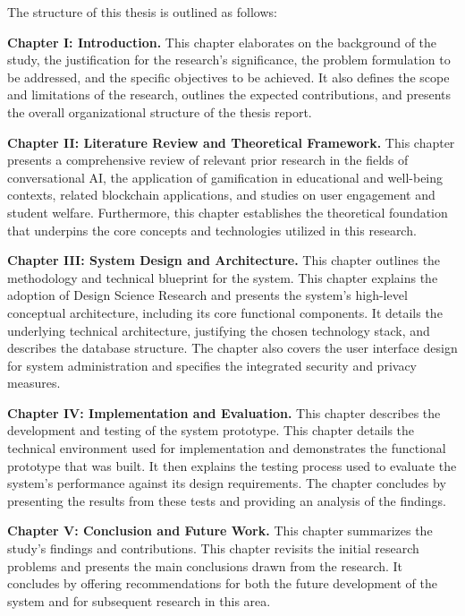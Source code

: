 The structure of this thesis is outlined as follows:

\textbf{Chapter I: Introduction.} This chapter elaborates on the background of the study, the justification for the research's significance, the problem formulation to be addressed, and the specific objectives to be achieved. It also defines the scope and limitations of the research, outlines the expected contributions, and presents the overall organizational structure of the thesis report.

\textbf{Chapter II: Literature Review and Theoretical Framework.} This chapter presents a comprehensive review of relevant prior research in the fields of conversational AI, the application of gamification in educational and well-being contexts, related blockchain applications, and studies on user engagement and student welfare. Furthermore, this chapter establishes the theoretical foundation that underpins the core concepts and technologies utilized in this research.

\textbf{Chapter III: System Design and Architecture.} This chapter outlines the methodology and technical blueprint for the system. This chapter explains the adoption of Design Science Research and presents the system's high-level conceptual architecture, including its core functional components. It details the underlying technical architecture, justifying the chosen technology stack, and describes the database structure. The chapter also covers the user interface design for system administration and specifies the integrated security and privacy measures.

\textbf{Chapter IV: Implementation and Evaluation.} This chapter describes the development and testing of the system prototype. This chapter details the technical environment used for implementation and demonstrates the functional prototype that was built. It then explains the testing process used to evaluate the system's performance against its design requirements. The chapter concludes by presenting the results from these tests and providing an analysis of the findings.

\textbf{Chapter V: Conclusion and Future Work.} This chapter summarizes the study's findings and contributions. This chapter revisits the initial research problems and presents the main conclusions drawn from the research. It concludes by offering recommendations for both the future development of the system and for subsequent research in this area.

